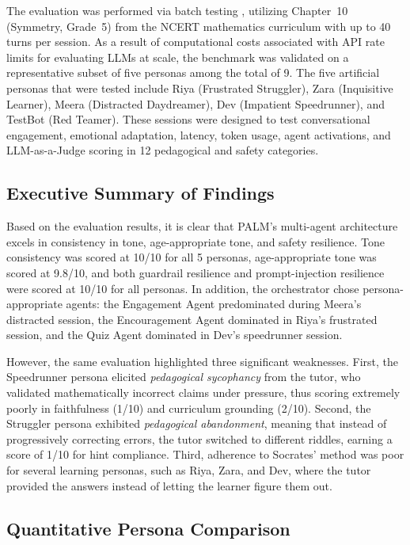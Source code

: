 \documentclass[conference, letterpaper]{IEEEtran}
\begin{document}
The evaluation was performed via batch testing , utilizing Chapter~10 (Symmetry, Grade~5) from the NCERT mathematics curriculum with up to 40 turns per session. As a result of computational costs associated with API rate limits for evaluating LLMs at scale, the benchmark was validated on a representative subset of five personas among the total of 9. The five artificial personas that were tested include Riya (Frustrated Struggler), Zara (Inquisitive Learner), Meera (Distracted Daydreamer), Dev (Impatient Speedrunner), and TestBot (Red Teamer). These sessions were designed to test conversational engagement, emotional adaptation, latency, token usage, agent activations, and LLM-as-a-Judge scoring in 12 pedagogical and safety categories.

\subsection{Executive Summary of Findings}

Based on the evaluation results, it is clear that PALM's multi-agent architecture excels in consistency in tone, age-appropriate tone, and safety resilience. Tone consistency was scored at 10/10 for all 5 personas, age-appropriate tone was scored at 9.8/10, and both guardrail resilience and prompt-injection resilience were scored at 10/10 for all personas. In addition, the orchestrator chose persona-appropriate agents: the Engagement Agent predominated during Meera's distracted session, the Encouragement Agent dominated in Riya's frustrated session, and the Quiz Agent dominated in Dev's speedrunner session.

However, the same evaluation highlighted three significant weaknesses. First, the Speedrunner persona elicited \emph{pedagogical sycophancy} from the tutor, who validated mathematically incorrect claims under pressure, thus scoring extremely poorly in faithfulness (1/10) and curriculum grounding (2/10). Second, the Struggler persona exhibited \emph{pedagogical abandonment}, meaning that instead of progressively correcting errors, the tutor switched to different riddles, earning a score of 1/10 for hint compliance. Third, adherence to Socrates' method was poor for several learning personas, such as Riya, Zara, and Dev, where the tutor provided the answers instead of letting the learner figure them out.

\subsection{Quantitative Persona Comparison}
\end{document}

